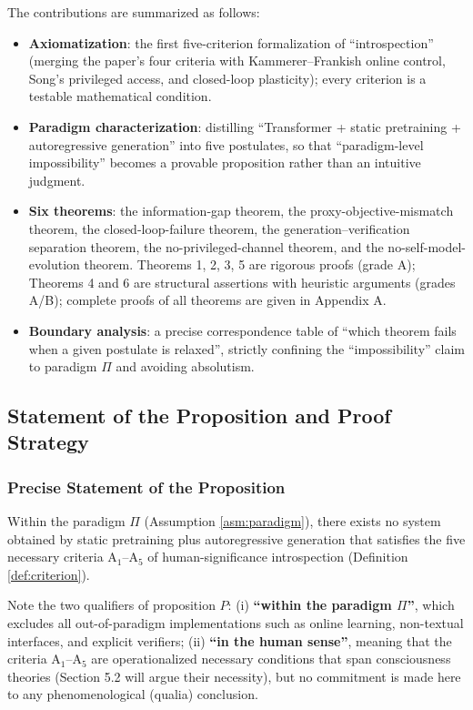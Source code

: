 The contributions are summarized as follows:

\begin{itemize}
\item \textbf{Axiomatization}: the first five-criterion formalization of ``introspection''
(merging the paper's four criteria with Kammerer--Frankish online control, Song's privileged
access, and closed-loop plasticity); every criterion is a testable mathematical condition.
\item \textbf{Paradigm characterization}: distilling ``Transformer + static pretraining +
autoregressive generation'' into five postulates, so that ``paradigm-level impossibility''
becomes a provable proposition rather than an intuitive judgment.
\item \textbf{Six theorems}: the information-gap theorem, the proxy-objective-mismatch theorem,
the closed-loop-failure theorem, the generation--verification separation theorem, the
no-privileged-channel theorem, and the no-self-model-evolution theorem. Theorems 1, 2, 3, 5
are rigorous proofs (grade A); Theorems 4 and 6 are structural assertions with heuristic
arguments (grades A/B); complete proofs of all theorems are given in Appendix A.
\item \textbf{Boundary analysis}: a precise correspondence table of ``which theorem fails when a
given postulate is relaxed'', strictly confining the ``impossibility'' claim to paradigm $\Pi$ and
avoiding absolutism.
\end{itemize}

\subsection{Statement of the Proposition and Proof Strategy}

\subsubsection{Precise Statement of the Proposition}

\begin{proposition}
Within the paradigm $\Pi$ (Assumption \ref{asm:paradigm}), there exists no system obtained by
static pretraining plus autoregressive generation that satisfies the five necessary criteria
$\mathrm{A}_1$--$\mathrm{A}_5$ of human-significance introspection (Definition
\ref{def:criterion}).
\end{proposition}

Note the two qualifiers of proposition $P$: (i) \textbf{``within the paradigm $\Pi$''},
which excludes all out-of-paradigm implementations such as online learning, non-textual
interfaces, and explicit verifiers; (ii) \textbf{``in the human sense''}, meaning that the criteria
$\mathrm{A}_1$--$\mathrm{A}_5$ are operationalized necessary conditions that span
consciousness theories (Section 5.2 will argue their necessity), but no commitment is made
here to any phenomenological (qualia) conclusion.

